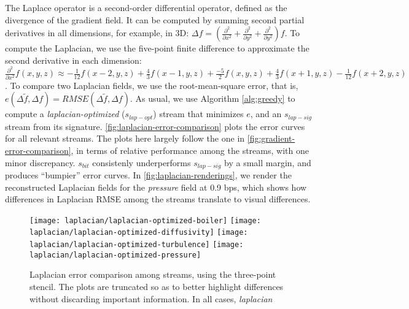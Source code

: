 The Laplace operator is a second-order differential operator, defined as the divergence of the
gradient field. It can be computed by summing second partial derivatives in all dimensions, for
example, in 3D: $\Delta
f=(\frac{{\partial}^2}{\partial{x^2}}+\frac{{\partial}^2}{\partial{y^2}}+\frac{{\partial}^2}{\partial{y^2}})f$.
To compute the Laplacian, we use the five-point finite difference to approximate the second
derivative in each dimension: $\frac{{\partial}^2}{\partial{x^2}}f(x,y,z) \approx
-\frac{1}{12}f(x-2,y,z)+\frac{4}{3}f(x-1,y,z)+\frac{-5}{2}f(x,y,z)+\frac{4}{3}f(x+1,y,z)-\frac{1}{12}f(x+2,y,z)$.
To compare two Laplacian fields, we use the root-mean-square error, that is, $e(\Delta
\tilde{f},\Delta f)=RMSE(\Delta \tilde{f},\Delta f)$. As usual, we use Algorithm \autoref{alg:greedy}
to compute a \emph{laplacian-optimized} ($s_{lap-opt}$) stream that minimizes $e$, and an
$s_{lap-sig}$ stream from its signature. \autoref{fig:laplacian-error-comparison} plots the error
curves for all relevant streams. The plots here largely follow the one in
\autoref{fig:gradient-error-comparison}, in terms of relative performance among the streams, with
one minor discrepancy. $s_{bit}$ consistenly underperforms $s_{lap-sig}$ by a small margin, and
produces ``bumpier'' error curves. In \autoref{fig:laplacian-renderings}, we render the
reconstructed Laplacian fields for the \emph{pressure} field at 0.9 bps, which shows how differences
in Laplacian RMSE among the streams translate to visual differences.

\begin{figure}[h]
	\centering
	{\texttt{[image: laplacian/laplacian-optimized-boiler]}}
	{\texttt{[image: laplacian/laplacian-optimized-diffusivity]}}
	{\texttt{[image: laplacian/laplacian-optimized-turbulence]}}
	{\texttt{[image: laplacian/laplacian-optimized-pressure]}}
	\caption{Laplacian error comparison among streams, using the three-point stencil. The plots are
	truncated so as to better highlight differences without discarding important information. In all
	cases, \emph{laplacian}}\label{fig:laplacian-error-comparison}
\end{figure}

